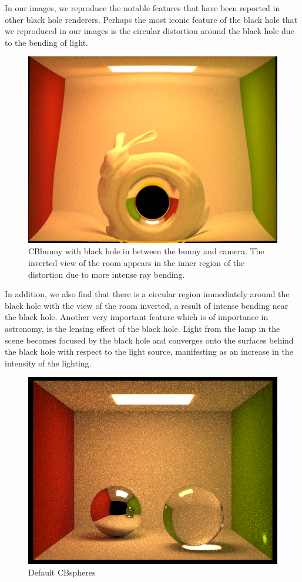 \documentclass[sigconf]{acmart}
\begin{document}
In our images, we reproduce the notable features that have been reported in other black hole renderers. Perhaps the most iconic feature of the black hole that we reproduced in our images is the circular distortion around the black hole due to the bending of light.
\begin{figure}[h]
  \centering
  \includegraphics[width=\linewidth]{bunny.png}
  \caption{CBbunny with black hole in between the bunny and camera.  The inverted view of the room appears in the inner region of the distortion due to more intense ray bending.}
  \Description{}
\end{figure}
In addition, we also find that there is a circular region immediately around the black hole with the view of the room inverted, a result of intense bending near the black hole.  Another very important feature which is of importance in astronomy, is the lensing effect of the black hole.  Light from the lamp in the scene becomes focused by the black hole and converges onto the surfaces behind the black hole with respect to the light source, manifesting as an increase in the intensity of the lighting.

\begin{figure}[h]
  \centering
  \includegraphics[width=\linewidth]{mirrors_nohole.png}
  \caption{Default CBspheres}
  \Description{}
\end{figure}
\end{document}

